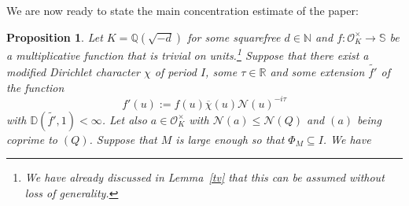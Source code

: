 \documentclass[11pt]{amsart}
\newtheorem{proposition}[lemma]{Proposition}
\theoremstyle{definition}
\newcommand{\D}{{\mathbb D}}
\newcommand{\N}{{\mathbb N}}
\newcommand{\NN}{{\mathcal N}}
\newcommand{\Q}{{\mathbb Q}}
\newcommand{\R}{{\mathbb R}}
\renewcommand{\S}{\mathbb{S}}
\newcommand{\mf}{\mathfrak}
\newcommand{\FM}[1]{{\color{violet}{{#1}}}}
\newcommand{\WS}[1]{{\color{blue}{{#1}}}}
\begin{document}

We are now ready to state the main concentration estimate of the paper:

\begin{proposition}\label{p25}
    Let $K=\Q(\sqrt{-d})$ for some squarefree $d\in\N$ and $f\colon \mathcal{O}_K^{\times}\to\S$ be a multiplicative function that is trivial on units.\footnote{We have already discussed in Lemma~\ref{tv} that this can be assumed without loss of generality.}
    Suppose that there exist a modified Dirichlet character $\chi$ of period $I$, some $\tau\in\R$ and  some extension $\tilde{f'}$ of the function 
    $$f'(u):=f(u)\overline{\chi}(u)\NN(u)^{-i\tau}$$
    with
    $\D(\tilde{f'}, 1)<\infty$. %
  Let also $a \in \mathcal{O}_K^{\times}$ with $\NN(a) \leq \NN(Q)$ and $(a)$ being coprime to $(Q)$.
   Suppose that $M$ is large enough so that $\Phi_M \subseteq I$. %
   We have 

\end{proposition}
\end{document}
